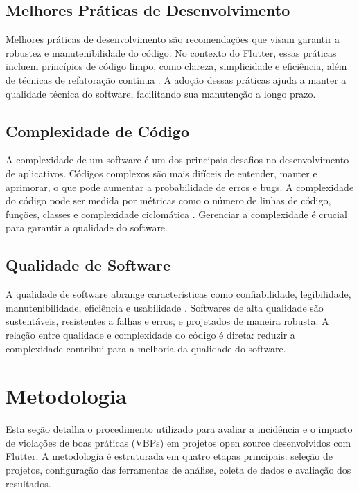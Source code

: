 \documentclass[12pt]{article}
\begin{document}
\subsection{Melhores Práticas de Desenvolvimento}
Melhores práticas de desenvolvimento são recomendações que visam garantir a robustez e manutenibilidade do código. No contexto do Flutter, essas práticas incluem princípios de código limpo, como clareza, simplicidade e eficiência, além de técnicas de refatoração contínua \cite{fowler1999refactoring}. A adoção dessas práticas ajuda a manter a qualidade técnica do software, facilitando sua manutenção a longo prazo.

\subsection{Complexidade de Código}
A complexidade de um software é um dos principais desafios no desenvolvimento de aplicativos. Códigos complexos são mais difíceis de entender, manter e aprimorar, o que pode aumentar a probabilidade de erros e bugs. A complexidade do código pode ser medida por métricas como o número de linhas de código, funções, classes e complexidade ciclomática \cite{mccabe1976complexity}. Gerenciar a complexidade é crucial para garantir a qualidade do software.

\subsection{Qualidade de Software}
A qualidade de software abrange características como confiabilidade, legibilidade, manutenibilidade, eficiência e usabilidade \cite{iso25010}. Softwares de alta qualidade são sustentáveis, resistentes a falhas e erros, e projetados de maneira robusta. A relação entre qualidade e complexidade do código é direta: reduzir a complexidade contribui para a melhoria da qualidade do software.

\section{Metodologia}

Esta seção detalha o procedimento utilizado para avaliar a incidência e o impacto de violações de boas práticas (VBPs) em projetos open source desenvolvidos com Flutter. A metodologia é estruturada em quatro etapas principais: seleção de projetos, configuração das ferramentas de análise, coleta de dados e avaliação dos resultados.
\end{document}
